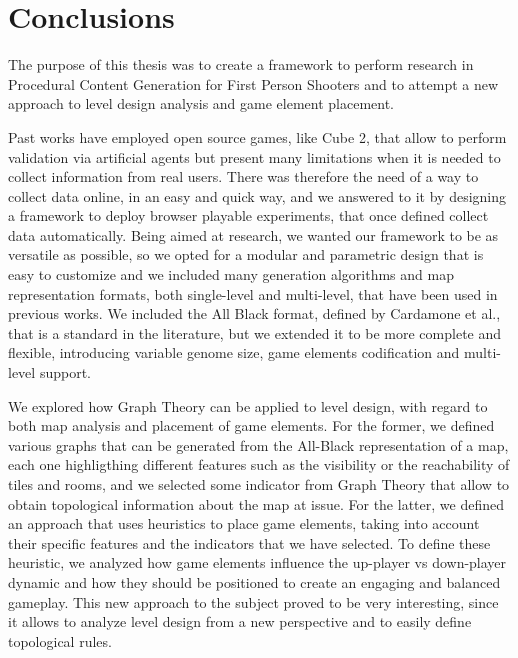 \chapter{Conclusions}


The purpose of this thesis was to create a framework to perform research in Procedural Content Generation for First Person Shooters and to attempt a new approach to level design analysis and game element placement. 

\par

Past works have employed open source games, like Cube 2, that allow to perform validation via artificial agents but present many limitations when it is needed to collect information from real users. There was therefore the need of a way to collect data online, in an easy and quick way, and we answered to it by designing a framework to deploy browser playable experiments, that once defined collect data automatically. Being aimed at research, we wanted our framework to be as versatile as possible, so we opted for a modular and parametric design that is easy to customize and we included many generation algorithms and map representation formats, both single-level and multi-level, that have been used in previous works. We included the All Black format, defined by Cardamone et al.\cite{Cardamone:2011:EIM:2008402.2008411}, that is a standard in the literature, but we extended it to be more complete and flexible, introducing variable genome size, game elements codification and multi-level support.

\par

We explored how Graph Theory can be applied to level design, with regard to both map analysis and placement of game elements. For the former, we defined various graphs that can be generated from the All-Black representation of a map, each one highligthing different features such as the visibility or the reachability of tiles and rooms, and we selected some indicator from Graph Theory that allow to obtain topological information about the map at issue. For the latter, we defined an approach that uses heuristics to place game elements, taking into account their specific features and the indicators that we have selected. To define these heuristic, we analyzed how game elements influence the up-player vs down-player dynamic and how they should be positioned to create an engaging and balanced gameplay. This new approach to the subject proved to be very interesting, since it allows to analyze level design from a new perspective and to easily define topological rules.

